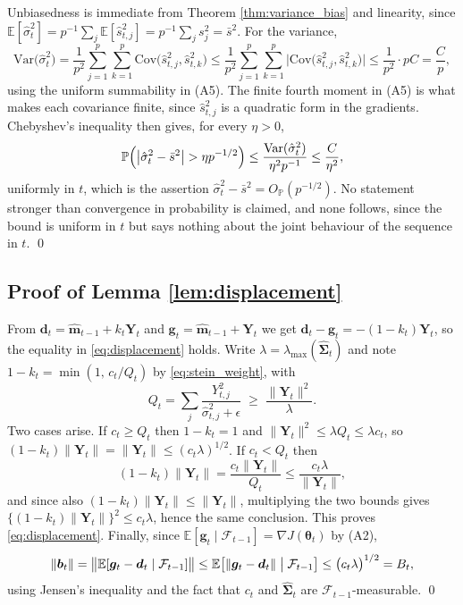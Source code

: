 \documentclass[a4paper,fleqn]{cas-sc}
\theoremstyle{plain}
\theoremstyle{definition}
\theoremstyle{remark}
\newcommand{\Var}{\mathrm{Var}}
\newcommand{\Cov}{\mathrm{Cov}}
\newcommand{\E}{\mathbb{E}}
\begin{document}
\begin{appendices}
Unbiasedness is immediate from Theorem \ref{thm:variance_bias} and linearity, since $\E[\hat\sigma^2_t]=p^{-1}\sum_j\E[\hat s^2_{t,j}]=p^{-1}\sum_js^2_j=\bar s^2$. For the variance,
\begin{equation}
\Var\bigl(\hat\sigma^2_t\bigr)
=
\frac{1}{p^{2}}\sum_{j=1}^{p}\sum_{k=1}^{p}\Cov\bigl(\hat s^2_{t,j},\hat s^2_{t,k}\bigr)
\le
\frac{1}{p^{2}}\sum_{j=1}^{p}\sum_{k=1}^{p}\bigl|\Cov\bigl(\hat s^2_{t,j},\hat s^2_{t,k}\bigr)\bigr|
\le
\frac{1}{p^{2}}\cdot pC
=\frac{C}{p},
\end{equation}
using the uniform summability in (A5). The finite fourth moment in (A5) is what makes each covariance finite, since $\hat s^2_{t,j}$ is a quadratic form in the gradients. Chebyshev's inequality then gives, for every $\eta>0$,
\begin{equation}
\mathbb P\Bigl(\bigl|\hat\sigma^2_t-\bar s^2\bigr|>\eta p^{-1/2}\Bigr)
\le
\frac{\Var(\hat\sigma^2_t)}{\eta^{2}p^{-1}}
\le
\frac{C}{\eta^{2}},
\end{equation}
uniformly in $t$, which is the assertion $\hat\sigma^2_t-\bar s^2=O_{\mathbb P}(p^{-1/2})$. No statement stronger than convergence in probability is claimed, and none follows, since the bound is uniform in $t$ but says nothing about the joint behaviour of the sequence in $t$. \qed

\subsection*{Proof of Lemma \ref{lem:displacement}}

From $\bm d_t=\hat{\bm m}_{t-1}+k_t\bm Y_t$ and $\bm g_t=\hat{\bm m}_{t-1}+\bm Y_t$ we get $\bm d_t-\bm g_t=-(1-k_t)\bm Y_t$, so the equality in \eqref{eq:displacement} holds. Write $\lambda=\lambda_{\max}(\widehat{\bm\Sigma}_t)$ and note $1-k_t=\min(1,\,c_t/Q_t)$ by \eqref{eq:stein_weight}, with
\begin{equation}
Q_t=\sum_{j}\frac{Y^2_{t,j}}{\hat\sigma^2_{t,j}+\epsilon}\;\ge\;\frac{\|\bm Y_t\|^2}{\lambda}.
\end{equation}
Two cases arise. If $c_t\ge Q_t$ then $1-k_t=1$ and $\|\bm Y_t\|^2\le\lambda Q_t\le\lambda c_t$, so $(1-k_t)\|\bm Y_t\|=\|\bm Y_t\|\le(c_t\lambda)^{1/2}$. If $c_t<Q_t$ then
\begin{equation}
(1-k_t)\|\bm Y_t\|=\frac{c_t\|\bm Y_t\|}{Q_t}\le\frac{c_t\lambda}{\|\bm Y_t\|},
\end{equation}
and since also $(1-k_t)\|\bm Y_t\|\le\|\bm Y_t\|$, multiplying the two bounds gives $\{(1-k_t)\|\bm Y_t\|\}^2\le c_t\lambda$, hence the same conclusion. This proves \eqref{eq:displacement}. Finally, since $\E[\bm g_t\mid\mathcal F_{t-1}]=\nabla J(\bm\theta_t)$ by (A2),
\begin{equation}
\|\bm b_t\|=\bigl\|\E[\bm g_t-\bm d_t\mid\mathcal F_{t-1}]\bigr\|
\le\E\bigl[\|\bm g_t-\bm d_t\|\bigm|\mathcal F_{t-1}\bigr]
\le\bigl(c_t\lambda\bigr)^{1/2}=B_t,
\end{equation}
using Jensen's inequality and the fact that $c_t$ and $\widehat{\bm\Sigma}_t$ are $\mathcal F_{t-1}$-measurable. \qed


\end{appendices}
\end{document}
